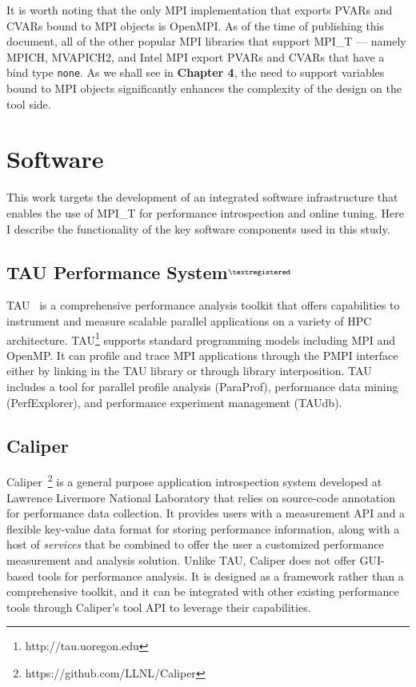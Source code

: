 \par It is worth noting that the only MPI implementation that exports PVARs and CVARs bound to MPI objects is OpenMPI. As of the time of publishing this document, all of the other popular MPI libraries that support MPI\_T --- namely MPICH, MVAPICH2, and Intel MPI export PVARs and CVARs that have a bind type \verb+none+. As we shall see in \textbf{Chapter 4}, the need to support variables bound to MPI objects significantly enhances the complexity of the design on the tool side.

\section {Software}
This work targets the development of an integrated software infrastructure that enables the use of MPI\_T for performance introspection and online tuning. Here I describe the functionality of the key software components used in this study.
\subsection{TAU Performance System$^{\tiny{\textregistered}}$}
TAU~\cite{Shende:2006:TPP:1125980.1125982} is a comprehensive performance analysis toolkit that offers capabilities to instrument and measure scalable parallel applications on a variety of HPC architecture.
TAU\footnote{http://tau.uoregon.edu} supports standard programming models including MPI and OpenMP. It can profile and trace MPI applications through the PMPI interface either by linking in the TAU library or through library interposition.
TAU includes a tool for parallel profile analysis (ParaProf), performance data mining (PerfExplorer), and performance experiment management (TAUdb).

\subsection {Caliper}
Caliper~\cite{CALIPER}\footnote{https://github.com/LLNL/Caliper} is a general purpose application introspection system developed at Lawrence Livermore National Laboratory that relies on source-code annotation for performance data collection. It provides users with a measurement API and a flexible key-value data format for storing performance information, along with a host of \textit{services} that be combined to offer the user a customized performance measurement and analysis solution. Unlike TAU, Caliper does not offer GUI-based tools for performance analysis. It is designed as a framework rather than a comprehensive toolkit, and it can be integrated with other existing performance tools through Caliper's tool API to leverage their capabilities.

